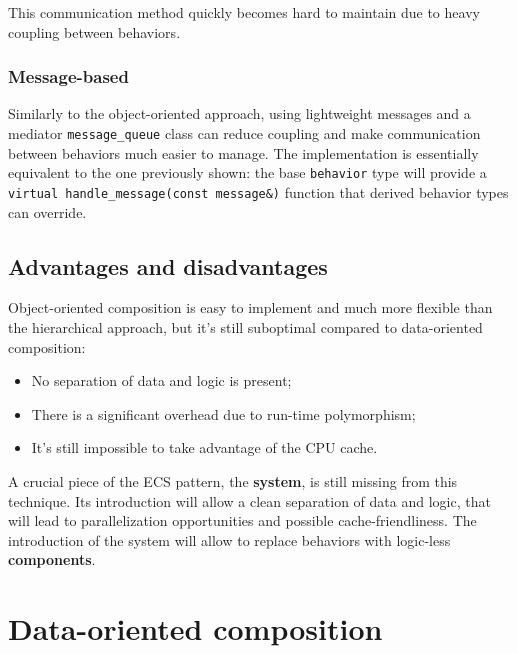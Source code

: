 \documentclass[twoside, 12pt, a4paper, openany]{book}
\begin{document}
This communication method quickly becomes hard to maintain due to heavy
coupling between behaviors.

\subsubsection{Message-based}\label{message-based-1}

Similarly to the object-oriented approach, using lightweight messages
and a mediator
\texttt{message_queue}
class can reduce coupling and make communication between behaviors much
easier to manage. The implementation is essentially equivalent to the
one previously shown: the base
\texttt{behavior}
type will provide a
\texttt{virtual handle_message(const message&)}
function that derived behavior types can override.

\subsection{Advantages and
disadvantages}\label{advantages-and-disadvantages-1}

Object-oriented composition is easy to implement and much more flexible
than the hierarchical approach, but it's still suboptimal compared to
data-oriented composition:

\begin{itemize}
\item
  No separation of data and logic is present;
\item
  There is a significant overhead due to run-time polymorphism;
\item
  It's still impossible to take advantage of the CPU cache.
\end{itemize}

A crucial piece of the ECS pattern, the \textbf{system}, is still
missing from this technique. Its introduction will allow a clean
separation of data and logic, that will lead to parallelization
opportunities and possible cache-friendliness. The introduction of the
system will allow to replace behaviors with logic-less
\textbf{components}.

\section{Data-oriented composition}\label{data-oriented-composition}
\end{document}
